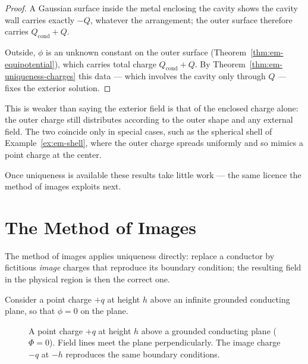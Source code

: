 \begin{proof}
A Gaussian surface inside the metal enclosing the cavity shows the cavity wall carries exactly $-Q$, whatever the arrangement; the outer surface therefore carries $Q_\text{cond}+Q$.

Outside, $\phi$ is an unknown constant on the outer surface (Theorem~\ref{thm:em-equipotential}), which carries total charge $Q_\text{cond}+Q$. By Theorem~\ref{thm:em-uniqueness-charges} this data --- which involves the cavity only through $Q$ --- fixes the exterior solution.
\end{proof}

This is weaker than saying the exterior field is that of the enclosed charge alone: the outer charge still distributes according to the outer shape and any external field. The two coincide only in special cases, such as the spherical shell of Example~\ref{ex:em-shell}, where the outer charge spreads uniformly and so mimics a point charge at the center.

Once uniqueness is available these results take little work --- the same licence the method of images exploits next.

\section{The Method of Images}

The method of images applies uniqueness directly: replace a conductor by fictitious \emph{image} charges that reproduce its boundary condition; the resulting field in the physical region is then the correct one.

Consider a point charge $+q$ at height $h$ above an infinite grounded conducting plane, so that $\phi = 0$ on the plane.

\begin{figure}[H]
\begin{center}
\end{center}
\caption{A point charge $+q$ at height $h$ above a grounded conducting plane ($\Phi=0$). Field lines meet the plane perpendicularly. The image charge $-q$ at $-h$ reproduces the same boundary conditions.}
\end{figure}

